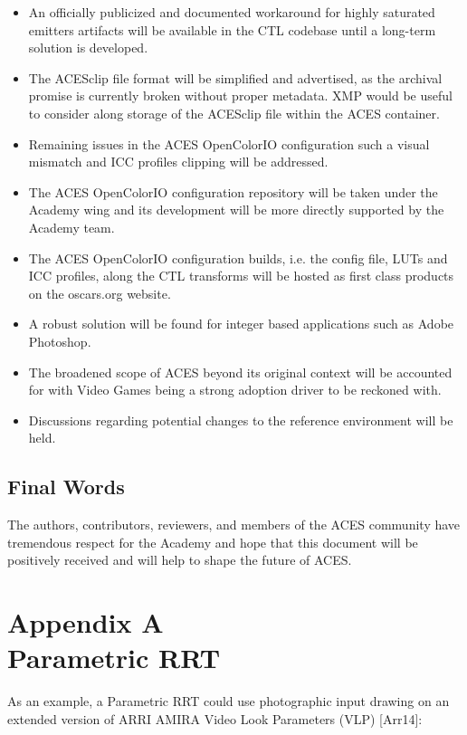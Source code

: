 \documentclass[conference]{IEEEtran}
\begin{document}
\begin{itemize}
	\item An officially publicized and documented workaround for highly saturated emitters artifacts will be available in the CTL codebase until a long-term solution is developed.
	\item The ACESclip file format will be simplified and advertised, as the archival promise is currently broken without proper metadata. XMP would be useful to consider along storage of the ACESclip file within the ACES container.
	\item Remaining issues in the ACES OpenColorIO configuration such a visual mismatch and ICC profiles clipping will be addressed.
	\item The ACES OpenColorIO configuration repository will be taken under the Academy wing and its development will be more directly supported by the Academy team.
	\item The ACES OpenColorIO configuration builds, i.e. the config file, LUTs and ICC profiles, along the CTL transforms will be hosted as first class products on the oscars.org website.
	\item A robust solution will be found for integer based applications such as Adobe Photoshop.
	\item The broadened scope of ACES beyond its original context will be accounted for with Video Games being a strong adoption driver to be reckoned with.
	\item Discussions regarding potential changes to the reference environment will be held.
\end{itemize}

\subsection{Final Words}
The authors, contributors, reviewers, and members of the ACES community have tremendous respect for the Academy and hope that this document will be positively received and will help to shape the future of ACES.

\section*{Appendix A\\ \small Parametric RRT}
As an example, a Parametric RRT could use photographic input drawing on an extended version of ARRI AMIRA Video Look Parameters (VLP) [Arr14]:
\end{document}
